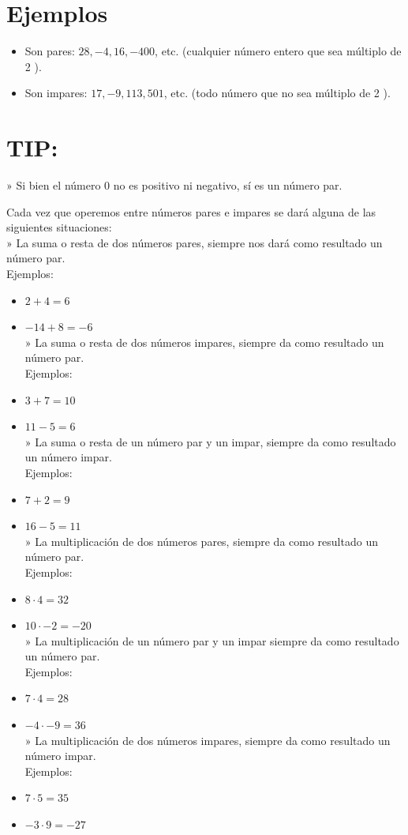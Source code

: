 \documentclass[10pt]{article}
\begin{document}
\section*{Ejemplos}
\begin{itemize}
  \item Son pares: $28,-4,16,-400$, etc. (cualquier número entero que sea múltiplo de 2 ).
  \item Son impares: $17,-9,113,501$, etc. (todo número que no sea múltiplo de 2 ).
\end{itemize}

\section*{TIP:}
» Si bien el número 0 no es positivo ni negativo, sí es un número par.

Cada vez que operemos entre números pares e impares se dará alguna de las siguientes situaciones:\\
» La suma o resta de dos números pares, siempre nos dará como resultado un número par.\\
Ejemplos:

\begin{itemize}
  \item $2+4=6$
  \item $-14+8=-6$\\
» La suma o resta de dos números impares, siempre da como resultado un número par.\\
Ejemplos:
  \item $3+7=10$
  \item $11-5=6$\\
» La suma o resta de un número par y un impar, siempre da como resultado un número impar.\\
Ejemplos:
  \item $7+2=9$
  \item $16-5=11$\\
» La multiplicación de dos números pares, siempre da como resultado un número par.\\
Ejemplos:
  \item $8 \cdot 4=32$
  \item $10 \cdot-2=-20$\\
» La multiplicación de un número par y un impar siempre da como resultado un número par.\\
Ejemplos:
  \item $7 \cdot 4=28$
  \item $-4 \cdot-9=36$\\
» La multiplicación de dos números impares, siempre da como resultado un número impar.\\
Ejemplos:
  \item $7 \cdot 5=35$
  \item $-3 \cdot 9=-27$
\end{itemize}
\end{document}
